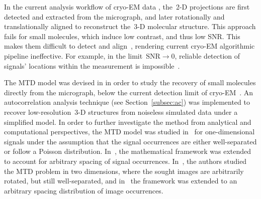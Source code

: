 \documentclass{article}
\begin{document}
In the current analysis workflow of \mbox{cryo-EM} data \cite{bendory2020single,singer2020computational,scheres2012relion,punjani2017cryosparc}, the~\mbox{2-D} projections are first detected and extracted from the micrograph, and later rotationally and translationally aligned to reconstruct the~\mbox{3-D} molecular structure. This approach fails for small molecules, which induce low contrast, and thus low SNR. This makes them difficult to detect and align~\cite{bendory2018toward,singer2020computational,henderson1995potential,aguerrebere2016fundamental}, rendering current \mbox{cryo-EM} algorithmic pipeline ineffective. For example, in the limit~\mbox{$\text{SNR} \rightarrow 0$}, reliable detection of signals' locations within the measurement is impossible~\cite[Proposition~3.1]{bendory2018toward}.

The MTD model was devised in \cite{bendory2018toward} in order to study the recovery of small molecules directly from the micrograph, below the current detection limit of \mbox{cryo-EM}~\cite{henderson1995potential,d2021current}. An autocorrelation analysis technique (see Section~\ref{subsec:ac}) was implemented to recover \mbox{low-resolution}~\mbox{3-D} structures from noiseless simulated data under a simplified model. In order to further investigate the method from analytical and computational perspectives, the MTD model was studied in~\cite{bendory2019multi} for one-dimensional signals  under the assumption that the signal occurrences are either {well-separated} or follow a Poisson distribution. In~\cite{lan2020multi}, the mathematical framework was extended to account for arbitrary spacing of signal occurrences. In~\cite{marshall2020image,bendory2021multi}, the authors studied the MTD problem in two dimensions, where the sought images are arbitrarily rotated, but still \mbox{well-separated}, and in~\cite{kreymer2021two} the framework was extended  to an arbitrary spacing distribution of image occurrences.
\end{document}
